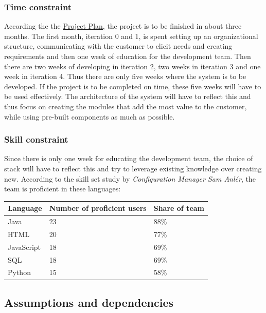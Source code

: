 \documentclass{article}
\begin{document}
\subsubsection{Time constraint}
According the the \href{https://gitlab.liu.se/tddc88-company-3-2020/deploy/-/tree/Document_branch/Project_Plan}{\underline{Project Plan}}, the project is to be finished in about three months. The first month, iteration 0 and 1, is spent setting up an organizational structure, communicating with the customer to elicit needs and creating requirements and then one week of education for the development team. Then there are two weeks of developing in iteration 2, two weeks in iteration 3 and one week in iteration 4. 
Thus there are only five weeks where the system is to be developed. If the project is to be completed on time, these five weeks will have to be used effectively. The architecture of the system will have to reflect this and thus focus on creating the modules that add the most value to the customer, while using pre-built components as much as possible.

\subsubsection{Skill constraint}
Since there is only one week for educating the development team, the choice of stack will have to reflect this and try to leverage existing knowledge over creating new. According to the skill set study by \emph{Configuration Manager Sam Anlér}, the team is proficient in these languages:

\begin{table}[h]
\centering
\begin{tabular}{|l|l|l|}
\hline
Language & Number of proficient users & Share of team \\ \hline
Java & 23 & 88\% \\
HTML & 20 & 77\% \\ 
JavaScript & 18 & 69\% \\ 
SQL & 18 & 69\% \\ 
Python & 15 & 58\% \\ 
\hline
\end{tabular}
\end{table}



\subsection{Assumptions and dependencies}
\end{document}
